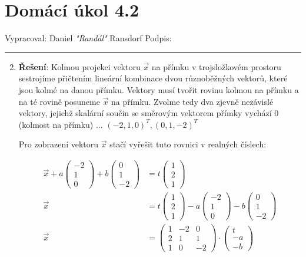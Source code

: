 \documentclass[12pt]{article}
\begin{document}
\section*{Domácí úkol 4.2}

Vypracoval: Daniel \textit{"Randál"} Ransdorf \hfill Podpis: \rule{4cm}{0.4pt}

\begin{enumerate}
  \setcounter{enumi}{1}
  \item \textbf{Řešení}:
    Kolmou projekci vektoru $\vec{x}$ na přímku v trojsložkovém prostoru sestrojíme
    přičtením lineární kombinace dvou různoběžných vektorů, které jsou kolmé na danou přímku.
    Vektory musí tvořit rovinu kolmou na přímku a na té rovině posuneme $\vec{x}$ na přímku.
    Zvolme tedy dva zjevně nezávislé vektory, jejichž skalární součin se směrovým vektorem přímky vychází 0 (kolmost na přímku)
    ... $(-2, 1, 0)^T, (0, 1, -2)^T$

    Pro zobrazení vektoru $\vec{x}$ stačí vyřešit tuto rovnici v realných číslech:
    
    \begin{align*}
      \vec{x} + a \left(\begin{array}{c} -2 \\ 1 \\ 0 \end{array}\right)
      + b \left(\begin{array}{c} 0 \\ 1 \\ -2 \end{array}\right)
      &= t \left(\begin{array}{c} 1 \\ 2 \\ 1 \end{array}\right) \\
      \vec{x} &= t \left(\begin{array}{c} 1 \\ 2 \\ 1 \end{array}\right)
      - a \left(\begin{array}{c} -2 \\ 1 \\ 0 \end{array}\right)
      - b \left(\begin{array}{c} 0 \\ 1 \\ -2 \end{array}\right) \\
      \vec{x} &= \left(\begin{array}{ccc} 1 & -2 & 0 \\ 2 & 1 & 1 \\ 1 & 0 & -2 \end{array}\right)
      \cdot \left(\begin{array}{c} t \\ -a \\ -b \end{array}\right)
    \end{align*}


\end{enumerate}
\end{document}
